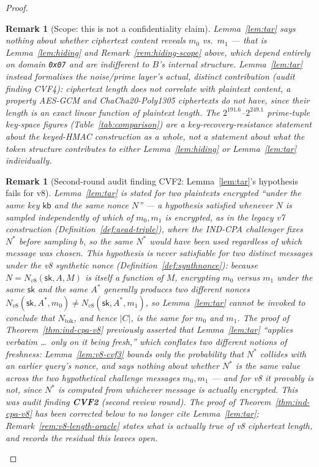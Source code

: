 \documentclass[11pt,a4paper]{article}
\newtheorem{remark}[theorem]{Remark}
\begin{document}
\begin{proof}
\begin{remark}[Scope: this is not a confidentiality claim]
Lemma~\ref{lem:tar} says nothing about whether ciphertext \emph{content}
reveals $m_0$ vs.\ $m_1$ --- that is Lemma~\ref{lem:hiding} and Remark~\ref{rem:hiding-scope}
above, which depend entirely on domain \texttt{0x07} and are indifferent to
$B$'s internal structure. Lemma~\ref{lem:tar} instead formalises the
noise/prime layer's actual, distinct contribution (audit finding CVF4):
ciphertext length does not correlate with plaintext content, a property
AES-GCM and ChaCha20-Poly1305 ciphertexts do not have, since their length
is an exact linear function of plaintext length. The $2^{191.6}$--$2^{249.1}$
prime-tuple key-space figures (Table~\ref{tab:comparison}) are a
key-recovery-resistance statement about the keyed-HMAC construction as a
whole, not a statement about what the token structure contributes to
either Lemma~\ref{lem:hiding} or Lemma~\ref{lem:tar} individually.
\end{remark}

\begin{remark}[Second-round audit finding CVF2: Lemma~\ref{lem:tar}'s hypothesis fails for v8]
\label{rem:cvf2-v2-tar-scope}
Lemma~\ref{lem:tar} is stated for two plaintexts encrypted ``under the
same key $\mathsf{kb}$ and the same nonce $N$'' --- a hypothesis satisfied
whenever $N$ is sampled independently of which of $m_0,m_1$ is encrypted,
as in the legacy v7 construction (Definition~\ref{def:aead-triple}), where
the IND-CPA challenger fixes $N^*$ \emph{before} sampling $b$, so the same
$N^*$ would have been used regardless of which message was chosen. This
hypothesis is never satisfiable for two \emph{distinct} messages under the
v8 synthetic nonce (Definition~\ref{def:synthnonce}): because
$N=N_{v8}(\mathsf{sk},A,M)$ is itself a function of $M$, encrypting $m_0$
versus $m_1$ under the same $\mathsf{sk}$ and the same $A^*$ generally
produces two \emph{different} nonces
$N_{v8}(\mathsf{sk},A^*,m_0)\neq N_{v8}(\mathsf{sk},A^*,m_1)$, so
Lemma~\ref{lem:tar} cannot be invoked to conclude that $N_{\mathrm{tok}}$,
and hence $|C|$, is the same for $m_0$ and $m_1$. The proof of
Theorem~\ref{thm:ind-cpa-v8} previously asserted that Lemma~\ref{lem:tar}
``applies verbatim \ldots\ only on it being fresh,'' which conflates two
different notions of freshness: Lemma~\ref{lem:v8-cvf3} bounds only the
probability that $N^*$ collides with an \emph{earlier query's} nonce, and
says nothing about whether $N^*$ is the \emph{same value} across the two
hypothetical challenge messages $m_0,m_1$ --- and for v8 it provably is
not, since $N^*$ is computed from whichever message is actually encrypted.
This was audit finding \textbf{CVF2} (second review round). The proof of
Theorem~\ref{thm:ind-cpa-v8} has been corrected below to no longer cite
Lemma~\ref{lem:tar}; Remark~\ref{rem:v8-length-oracle} states what is
actually true of v8 ciphertext length, and records the residual this
leaves open.
\end{remark}


\end{proof}
\end{document}
